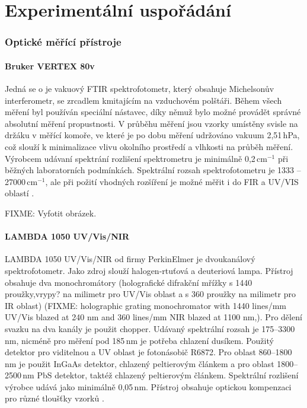 \chapter{Experimentální uspořádání}

\subsection{Optické měřící přístroje}

\subsubsection{Bruker VERTEX 80v}
Jedná se o je vakuový FTIR spektrofotometr, který obsahuje Michelsonův interferometr, se zrcadlem kmitajícím na vzduchovém polštáři. Během všech měření byl používán speciální nástavec, díky němuž bylo možné provádět správné absolutní měření propustnosti. V průběhu měření jsou vzorky umístěny svisle na držáku v měřící komoře, ve které je po dobu měření udržováno vakuum 2,51\,hPa, což slouží k minimalizace vlivu okolního prostředí a vlhkosti na průběh měření. Výrobcem udávaní spektrání rozlišení spektrometru je minimálně 0,2\,cm$^{-1}$ při běžných laboratorních podmínkách. Spektrální rozsah spektrofotometru je 1333 -- 27000\,cm$^{-1}$, ale při požití vhodných rozšíření je možné měřit i do FIR a UV/VIS oblastí \cite{vertex}.

FIXME: Vyfotit obrázek.


\subsubsection{LAMBDA 1050 UV/Vis/NIR}
LAMBDA 1050 UV/Vis/NIR od firmy PerkinElmer je dvoukanálový spektrofotometr. Jako zdroj slouží halogen-rtuťová a deuteriová lampa.  Přístroj obsahuje dva monochromátory (holografické difrakční mřížky s 1440 proužky,vrypy? na milimetr pro UV/Vis oblast a s 360 proužky na milimetr pro IR oblast)  (FIXME: holographic grating monochromator with 1440 lines/mm UV/Vis blazed at 240 nm and 360 lines/mm NIR blazed at 1100 nm,). Pro dělení svazku na dva kanály je použit chopper. Udávaný spektrální rozsah je 175--3300\,nm, nicméně pro měření pod 185\,nm je potřeba chlazení dusíkem. Použitý detektor pro viditelnou a UV oblast je fotonásobič R6872. Pro oblast 860--1800\,nm je použit InGaAs detektor, chlazený peltierovým článkem a pro oblast 1800--2500\,nm PbS detektor, taktéž chlazený peltierovým článkem. Spektrální rozlišení výrobce udává jako minimálně 0,05\,nm. Přístroj obsahuje optickou kompenzaci pro různé tloušťky vzorků \cite{lambda}.


